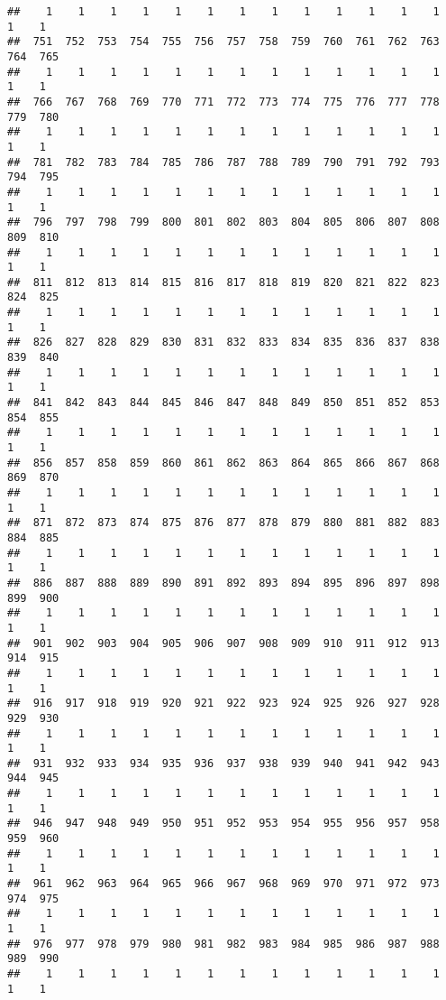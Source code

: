 \documentclass[]{article}
\begin{document}
\begin{verbatim}
##    1    1    1    1    1    1    1    1    1    1    1    1    1    1    1 
##  751  752  753  754  755  756  757  758  759  760  761  762  763  764  765 
##    1    1    1    1    1    1    1    1    1    1    1    1    1    1    1 
##  766  767  768  769  770  771  772  773  774  775  776  777  778  779  780 
##    1    1    1    1    1    1    1    1    1    1    1    1    1    1    1 
##  781  782  783  784  785  786  787  788  789  790  791  792  793  794  795 
##    1    1    1    1    1    1    1    1    1    1    1    1    1    1    1 
##  796  797  798  799  800  801  802  803  804  805  806  807  808  809  810 
##    1    1    1    1    1    1    1    1    1    1    1    1    1    1    1 
##  811  812  813  814  815  816  817  818  819  820  821  822  823  824  825 
##    1    1    1    1    1    1    1    1    1    1    1    1    1    1    1 
##  826  827  828  829  830  831  832  833  834  835  836  837  838  839  840 
##    1    1    1    1    1    1    1    1    1    1    1    1    1    1    1 
##  841  842  843  844  845  846  847  848  849  850  851  852  853  854  855 
##    1    1    1    1    1    1    1    1    1    1    1    1    1    1    1 
##  856  857  858  859  860  861  862  863  864  865  866  867  868  869  870 
##    1    1    1    1    1    1    1    1    1    1    1    1    1    1    1 
##  871  872  873  874  875  876  877  878  879  880  881  882  883  884  885 
##    1    1    1    1    1    1    1    1    1    1    1    1    1    1    1 
##  886  887  888  889  890  891  892  893  894  895  896  897  898  899  900 
##    1    1    1    1    1    1    1    1    1    1    1    1    1    1    1 
##  901  902  903  904  905  906  907  908  909  910  911  912  913  914  915 
##    1    1    1    1    1    1    1    1    1    1    1    1    1    1    1 
##  916  917  918  919  920  921  922  923  924  925  926  927  928  929  930 
##    1    1    1    1    1    1    1    1    1    1    1    1    1    1    1 
##  931  932  933  934  935  936  937  938  939  940  941  942  943  944  945 
##    1    1    1    1    1    1    1    1    1    1    1    1    1    1    1 
##  946  947  948  949  950  951  952  953  954  955  956  957  958  959  960 
##    1    1    1    1    1    1    1    1    1    1    1    1    1    1    1 
##  961  962  963  964  965  966  967  968  969  970  971  972  973  974  975 
##    1    1    1    1    1    1    1    1    1    1    1    1    1    1    1 
##  976  977  978  979  980  981  982  983  984  985  986  987  988  989  990 
##    1    1    1    1    1    1    1    1    1    1    1    1    1    1    1 

\end{verbatim}
\end{document}
